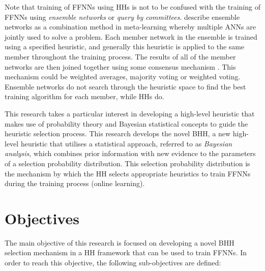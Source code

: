 Note that training of \acp{FFNN} using \acp{HH} is not to be confused with the training of \acp{FFNN} using \textit{ensemble networks} or \textit{query by committees}. \citeauthor{ref:pappa:2014} \cite{ref:pappa:2014} describe ensemble networks as a combination method in meta-learning whereby multiple \acp{ANN} are jointly used to solve a problem. Each member network in the ensemble is trained using a specified heuristic, and generally this heuristic is applied to the same member throughout the training process. The results of all of the member networks are then joined together using some consensus mechanism \cite{ref:zhou:2002}. This mechanism could be weighted averages, majority voting or weighted voting. Ensemble networks do not search through the heuristic space to find the best training algorithm for each member, while \acp{HH} do.

This research takes a particular interest in developing a high-level heuristic that makes use of probability theory and Bayesian statistical concepts to guide the heuristic selection process. This research develops the novel \Acf{BHH}, a new high-level heuristic that utilises a statistical approach, referred to as \textit{Bayesian analysis}, which combines prior information with new evidence to the parameters of a selection probability distribution. This selection probability distribution is the mechanism by which the \ac{HH} selects appropriate heuristics to train \acp{FFNN} during the training process (online learning).


\section{Objectives}\label{sec:introduction:objectives}

The main objective of this research is focused on developing a novel \Ac{BHH} selection mechanism in a \ac{HH} framework that can be used to train \acp{FFNN}. In order to reach this objective, the following sub-objectives are defined:

